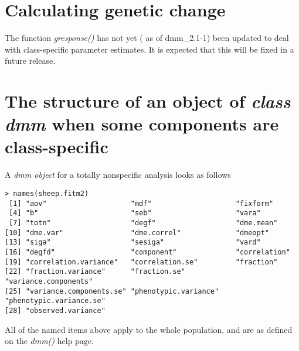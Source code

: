 \documentclass[titlepage]{article}  %
\begin{document}
\section{Calculating genetic change}
The function {\em gresponse()} has not yet ( as of dmm\_2.1-1) been updated to deal with class-specific parameter estimates. It is expected that this will be fixed in a future release.


\section{The structure of an object of {\em class dmm} when some components are class-specific}
A {\em dmm object} for a totally nonspecific analysis looks as follows
\begin{verbatim}
> names(sheep.fitm2)
 [1] "aov"                    "mdf"                    "fixform"               
 [4] "b"                      "seb"                    "vara"                  
 [7] "totn"                   "degf"                   "dme.mean"              
[10] "dme.var"                "dme.correl"             "dmeopt"                
[13] "siga"                   "sesiga"                 "vard"                  
[16] "degfd"                  "component"              "correlation"           
[19] "correlation.variance"   "correlation.se"         "fraction"              
[22] "fraction.variance"      "fraction.se"            "variance.components"   
[25] "variance.components.se" "phenotypic.variance"    "phenotypic.variance.se"
[28] "observed.variance" 
\end{verbatim}
All of the named items above apply to the whole population, and are as defined on the {\em dmm()} help page.
\end{document}
